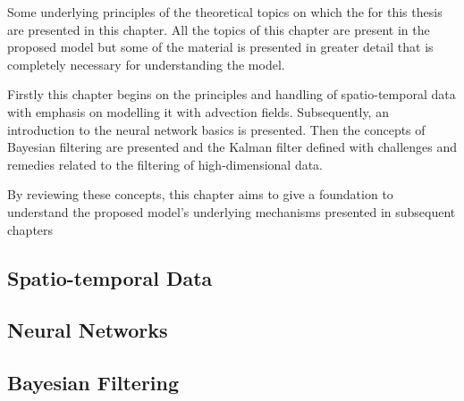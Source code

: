 Some underlying principles of the theoretical topics on which the  for this thesis are presented in this chapter.
All the topics of this chapter are present in the proposed model but some of the material is presented in greater detail that is completely necessary for understanding the model.

Firstly this chapter begins on the principles and handling of spatio-temporal data with emphasis on modelling it with advection fields.
Subsequently, an introduction to the neural network basics is presented.
Then the concepts of Bayesian filtering are presented and the Kalman filter defined with challenges and remedies related to the filtering of high-dimensional data. 

By reviewing these concepts, this chapter aims to give a foundation to understand the proposed model's underlying mechanisms presented in subsequent chapters

\subsection{Spatio-temporal Data}

\subsection{Neural Networks}

\subsection{Bayesian Filtering}

